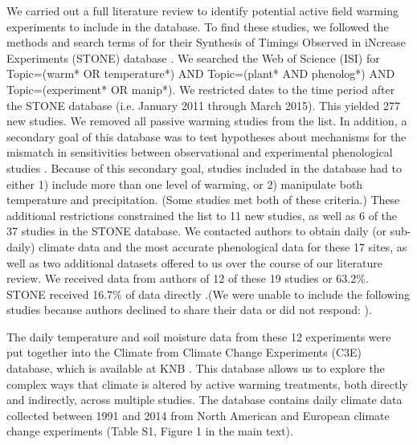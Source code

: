 \documentclass{article}
\begin{document}
\par We carried out a full literature review to identify potential active field warming experiments to include in the database. To find these studies, we followed the methods and search terms of \citet{wolkovich2012} for their Synthesis of Timings Observed in iNcrease Experiments (STONE) database \citep{wolkovich2012}. We searched the Web of Science (ISI) for Topic=(warm* OR temperature*) AND Topic=(plant* AND phenolog*) AND Topic=(experiment* OR manip*). We restricted dates to the time period after the STONE database (i.e. January 2011 through March 2015). This yielded 277 new studies. We removed all passive warming studies from the list. In addition, a secondary goal of this database was to test hypotheses about mechanisms for the mismatch in sensitivities between observational and experimental phenological studies \citep{wolkovich2012}. Because of this secondary goal, studies included in the database had to either 1) include more than one level of warming, or 2) manipulate both temperature and precipitation. (Some studies met both of these criteria.) These additional restrictions constrained the list to 11 new studies, as well as 6 of the 37 studies in the STONE database. We contacted authors to obtain daily (or sub-daily) climate data and the most accurate phenological data for these 17 sites, as well as two additional datasets offered to us over the course of our literature review.  We received data from authors of 12 of these 19 studies or 63.2\%. STONE received 16.7\% of data directly \citep{wolkovich2012}.(We were unable to include the following studies because authors declined to share their data or did not respond: \citep{schwartzberg2014,moser2011,caron2015,ellebjerg2008}).%
\par The daily temperature and soil moisture data from these 12 experiments were put together into the Climate from Climate Change Experiments (C3E) database, which is available at KNB \citep{ettinger2017}. This database allows us to explore the complex ways that climate is altered by active warming treatments, both directly and indirectly, across multiple studies. The database contains daily climate data collected between 1991 and 2014 from North American and European climate change experiments (Table S1, Figure 1 in the main text). 
\end{document}

